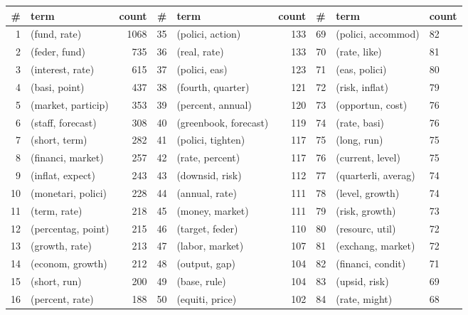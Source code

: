 \begin{tabular}{rlrrlrlll}
\toprule
  \# &                 term & count &   \# &                   term & count &    \# &                  term & count \\
\midrule
  1 &         (fund, rate) &  1068 &  35 &       (polici, action) &   133 &   69 &    (polici, accommod) &    82 \\
  2 &        (feder, fund) &   735 &  36 &           (real, rate) &   133 &   70 &          (rate, like) &    81 \\
  3 &     (interest, rate) &   615 &  37 &          (polici, eas) &   123 &   71 &         (eas, polici) &    80 \\
  4 &        (basi, point) &   437 &  38 &      (fourth, quarter) &   121 &   72 &        (risk, inflat) &    79 \\
  5 &   (market, particip) &   353 &  39 &      (percent, annual) &   120 &   73 &      (opportun, cost) &    76 \\
  6 &    (staff, forecast) &   308 &  40 &  (greenbook, forecast) &   119 &   74 &          (rate, basi) &    76 \\
  7 &        (short, term) &   282 &  41 &      (polici, tighten) &   117 &   75 &           (long, run) &    75 \\
  8 &    (financi, market) &   257 &  42 &        (rate, percent) &   117 &   76 &      (current, level) &    75 \\
  9 &     (inflat, expect) &   243 &  43 &        (downsid, risk) &   112 &   77 &   (quarterli, averag) &    74 \\
 10 &   (monetari, polici) &   228 &  44 &         (annual, rate) &   111 &   78 &       (level, growth) &    74 \\
 11 &         (term, rate) &   218 &  45 &        (money, market) &   111 &   79 &        (risk, growth) &    73 \\
 12 &   (percentag, point) &   215 &  46 &        (target, feder) &   110 &   80 &       (resourc, util) &    72 \\
 13 &       (growth, rate) &   213 &  47 &        (labor, market) &   107 &   81 &     (exchang, market) &    72 \\
 14 &     (econom, growth) &   212 &  48 &          (output, gap) &   104 &   82 &     (financi, condit) &    71 \\
 15 &         (short, run) &   200 &  49 &           (base, rule) &   104 &   83 &         (upsid, risk) &    69 \\
 16 &      (percent, rate) &   188 &  50 &        (equiti, price) &   102 &   84 &         (rate, might) &    68 \\

\end{tabular}
